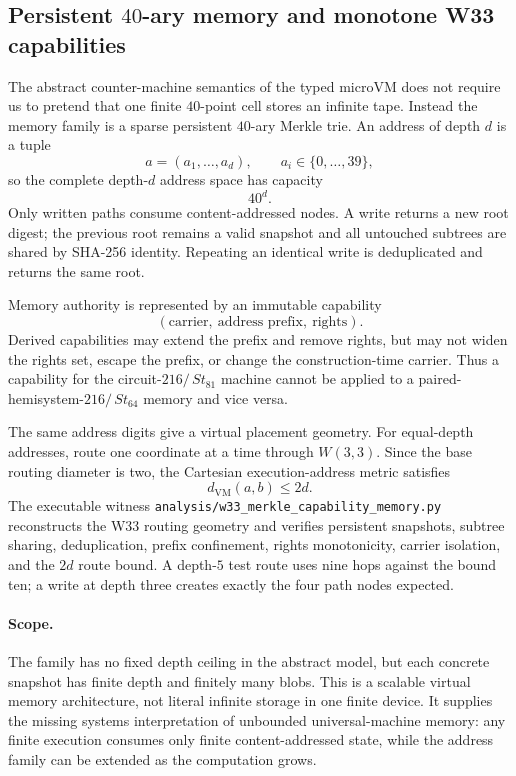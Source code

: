 
\subsection{Persistent $40$-ary memory and monotone W33 capabilities}

The abstract counter-machine semantics of the typed microVM does not require us
to pretend that one finite $40$-point cell stores an infinite tape.  Instead the
memory family is a sparse persistent $40$-ary Merkle trie.  An address of depth
$d$ is a tuple
\[
 a=(a_1,\ldots,a_d),\qquad a_i\in\{0,\ldots,39\},
\]
so the complete depth-$d$ address space has capacity
\[
 \boxed{40^d}.
\]
Only written paths consume content-addressed nodes.  A write returns a new root
digest; the previous root remains a valid snapshot and all untouched subtrees
are shared by SHA-256 identity.  Repeating an identical write is deduplicated
and returns the same root.

Memory authority is represented by an immutable capability
\[
 (\text{carrier},\ \text{address prefix},\ \text{rights}).
\]
Derived capabilities may extend the prefix and remove rights, but may not widen
the rights set, escape the prefix, or change the construction-time carrier.
Thus a capability for the circuit-$216/\,St_{81}$ machine cannot be applied to a
paired-hemisystem-$216/\,St_{64}$ memory and vice versa.

The same address digits give a virtual placement geometry.  For equal-depth
addresses, route one coordinate at a time through $W(3,3)$.  Since the base
routing diameter is two, the Cartesian execution-address metric satisfies
\[
 \boxed{d_{\mathrm{VM}}(a,b)\le 2d}.
\]
The executable witness
\texttt{analysis/w33\_merkle\_capability\_memory.py} reconstructs the W33
routing geometry and verifies persistent snapshots, subtree sharing,
deduplication, prefix confinement, rights monotonicity, carrier isolation, and
the $2d$ route bound.  A depth-$5$ test route uses nine hops against the bound
ten; a write at depth three creates exactly the four path nodes expected.

\paragraph{Scope.}
The family has no fixed depth ceiling in the abstract model, but each concrete
snapshot has finite depth and finitely many blobs.  This is a scalable virtual
memory architecture, not literal infinite storage in one finite device.  It
supplies the missing systems interpretation of unbounded universal-machine
memory: any finite execution consumes only finite content-addressed state, while
the address family can be extended as the computation grows.
